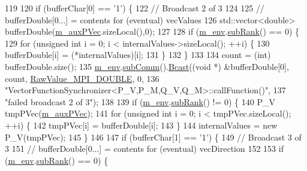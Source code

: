 \begin{DoxyCode}
119 
120       \textcolor{keywordflow}{if} (bufferChar[0] == \textcolor{charliteral}{'1'}) \{
122         \textcolor{comment}{// Broadcast 2 of 3}
124 \textcolor{comment}{}
125         \textcolor{comment}{// bufferDouble[0...] = contents for (eventual) vecValues}
126         std::vector<double> bufferDouble(\hyperlink{class_q_u_e_s_o_1_1_vector_function_synchronizer_af93da0ecec2b078ddacc8135f81cd996}{m\_auxPVec}.sizeLocal(),0);
127 
128         \textcolor{keywordflow}{if} (\hyperlink{class_q_u_e_s_o_1_1_vector_function_synchronizer_a36c2a9e1a2d317dddb5cf51b68e5c659}{m\_env}.\hyperlink{class_q_u_e_s_o_1_1_base_environment_a172d52f993f1322ed45aaddf71518dbb}{subRank}() == 0) \{
129           \textcolor{keywordflow}{for} (\textcolor{keywordtype}{unsigned} \textcolor{keywordtype}{int} i = 0; i < internalValues->sizeLocal(); ++i) \{
130             bufferDouble[i] = (*internalValues)[i];
131           \}
132         \}
133 
134         count = (int) bufferDouble.size();
135         \hyperlink{class_q_u_e_s_o_1_1_vector_function_synchronizer_a36c2a9e1a2d317dddb5cf51b68e5c659}{m\_env}.\hyperlink{class_q_u_e_s_o_1_1_base_environment_affe39f53e3d5d678842413370af09145}{subComm}().\hyperlink{class_q_u_e_s_o_1_1_mpi_comm_abd6af8db8b0c7fd2f5b62e26477a9537}{Bcast}((\textcolor{keywordtype}{void} *) &bufferDouble[0], count, 
      \hyperlink{_mpi_comm_8h_ad0f503bd9fecfe4e570ca3d15aaf2518}{RawValue\_MPI\_DOUBLE}, 0,
136                               \textcolor{stringliteral}{"VectorFunctionSynchronizer<P\_V,P\_M,Q\_V,Q\_M>::callFunction()"},
137                               \textcolor{stringliteral}{"failed broadcast 2 of 3"});
138 
139         \textcolor{keywordflow}{if} (\hyperlink{class_q_u_e_s_o_1_1_vector_function_synchronizer_a36c2a9e1a2d317dddb5cf51b68e5c659}{m\_env}.\hyperlink{class_q_u_e_s_o_1_1_base_environment_a172d52f993f1322ed45aaddf71518dbb}{subRank}() != 0) \{
140           P\_V tmpPVec(\hyperlink{class_q_u_e_s_o_1_1_vector_function_synchronizer_af93da0ecec2b078ddacc8135f81cd996}{m\_auxPVec});
141           \textcolor{keywordflow}{for} (\textcolor{keywordtype}{unsigned} \textcolor{keywordtype}{int} i = 0; i < tmpPVec.sizeLocal(); ++i) \{
142             tmpPVec[i] = bufferDouble[i];
143           \}
144           internalValues = \textcolor{keyword}{new} P\_V(tmpPVec);
145         \}
146 
147         \textcolor{keywordflow}{if} (bufferChar[1] == \textcolor{charliteral}{'1'}) \{
149           \textcolor{comment}{// Broadcast 3 of 3}
151 \textcolor{comment}{}          \textcolor{comment}{// bufferDouble[0...] = contents for (eventual) vecDirection}
152 
153           \textcolor{keywordflow}{if} (\hyperlink{class_q_u_e_s_o_1_1_vector_function_synchronizer_a36c2a9e1a2d317dddb5cf51b68e5c659}{m\_env}.\hyperlink{class_q_u_e_s_o_1_1_base_environment_a172d52f993f1322ed45aaddf71518dbb}{subRank}() == 0) \{

\end{DoxyCode}
